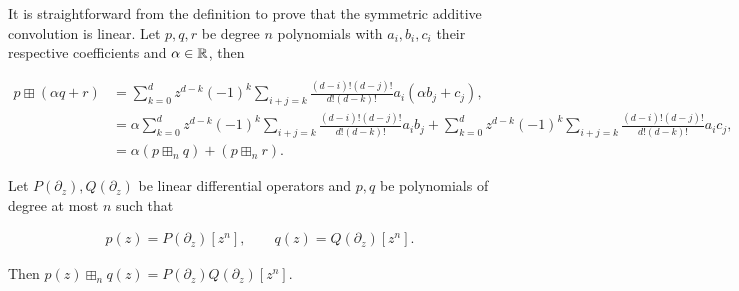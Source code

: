 It is straightforward from the definition to prove that the symmetric additive convolution is linear. Let $p,q,r$ be degree $n$ polynomials with $a_i, b_i, c_i$ their respective coefficients and $\alpha \in \mathbb R$, then

\begin{align*}
    p \boxplus (\alpha q + r) &= \sum_{k=0}^d z^{d-k}(-1)^k \sum_{i+j = k} \frac{(d-i)!(d-j)!}{d!(d-k)!}a_i (\alpha b_j + c_j), \\ 
    &= \alpha \sum_{k=0}^d z^{d-k}(-1)^k \sum_{i+j = k} \frac{(d-i)!(d-j)!}{d!(d-k)!}a_i b_j + \sum_{k=0}^d z^{d-k}(-1)^k \sum_{i+j = k} \frac{(d-i)!(d-j)!}{d!(d-k)!}a_i c_j,\\
    &= \alpha(p \boxplus_n q) + (p \boxplus_n r).
\end{align*}

\begin{theorem} \label{thm:multiplicative_operators}
    Let $P(\partial_z), Q(\partial_z)$ be linear differential operators and $p,q$ be polynomials of degree at most $n$ such that

    \begin{align*}
        p(z) = P(\partial_z)[z^n], \qquad q(z) =Q(\partial_z)[z^n].
    \end{align*}

    Then $p(z) \boxplus_n q(z) = P(\partial_z)Q(\partial_z)[z^n]$.
\end{theorem}

